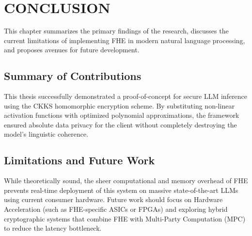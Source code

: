\chapter{CONCLUSION}

This chapter summarizes the primary findings of the research, discusses the current limitations of implementing FHE in modern natural language processing, and proposes avenues for future development.

\section{Summary of Contributions}
This thesis successfully demonstrated a proof-of-concept for secure LLM inference using the CKKS homomorphic encryption scheme. By substituting non-linear activation functions with optimized polynomial approximations, the framework ensured absolute data privacy for the client without completely destroying the model's linguistic coherence.

\section{Limitations and Future Work}
While theoretically sound, the sheer computational and memory overhead of FHE prevents real-time deployment of this system on massive state-of-the-art LLMs using current consumer hardware. Future work should focus on Hardware Acceleration (such as FHE-specific ASICs or FPGAs) and exploring hybrid cryptographic systems that combine FHE with Multi-Party Computation (MPC) to reduce the latency bottleneck.